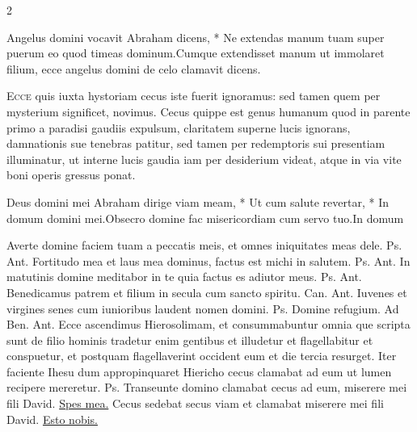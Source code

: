 \begin{multicols*}{2}
\begin{responsory}
{Angelus domini vocavit Abraham dicens, * Ne extendas manum tuam super puerum eo quod timeas dominum.}{Cumque extendisset manum ut immolaret filium, ecce angelus domini de celo clamavit dicens.}
\end{responsory}%
\lettrine[lines=2]{\zallmancaps \color{Blue} E}{cce} quis iuxta hystoriam cecus iste fuerit ignoramus: sed tamen quem per mysterium significet, novimus. Cecus quippe est genus humanum quod in parente primo a paradisi gaudiis expulsum, claritatem superne lucis ignorans, damnationis sue tenebras patitur, sed tamen per redemptoris sui presentiam illuminatur, ut interne lucis gaudia iam per desiderium videat, atque in via vite boni operis gressus ponat.
\begin{responsory-final}
{Deus domini mei Abraham dirige viam meam, * Ut cum salute revertar, * In domum domini mei.}{Obsecro domine fac misericordiam cum servo tuo.}{In domum}
\end{responsory-final}%
 Averte domine faciem tuam a peccatis meis, et omnes iniquitates meas dele. {\color{Red} Ps.}  {\color{Red} Ant.} Fortitudo mea et laus mea dominus, factus est michi in salutem. {\color{Red} Ps.}  {\color{Red} Ant.} In matutinis domine meditabor in te quia factus es adiutor meus. {\color{Red} Ps.}  {\color{Red} Ant.} Benedicamus patrem et filium in secula cum sancto spiritu. {\color{Red} Can.}  {\color{Red} Ant.} Iuvenes et virgines senes cum iunioribus laudent nomen domini. {\color{Red} Ps.}  \V Domine refugium. {\color{Red} Ad Ben. Ant.} Ecce ascendimus Hierosolimam, et consummabuntur omnia que scripta sunt de filio hominis tradetur enim gentibus et illudetur et flagellabitur et conspuetur, et postquam flagellaverint occident eum et die tercia resurget.
 Iter faciente Ihesu dum appropinquaret Hiericho cecus clamabat ad eum ut lumen recipere mereretur. {\color{Red} Ps.} 
 Transeunte domino clamabat cecus ad eum, miserere mei fili David. \R \hyperlink{spes-mea}{Spes mea.}
 Cecus sedebat secus viam et clamabat miserere mei fili David. \R \hyperlink{esto-nobis}{Esto nobis.}

\end{multicols*}
